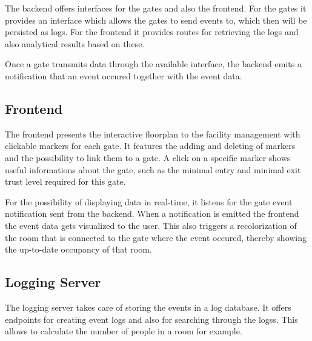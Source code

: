 The backend offers interfaces for the gates and also the frontend. For the gates it provides an interface which allows the gates to send events to, which then will be persisted as logs.
For the frontend it provides routes for retrieving the logs and also analytical results based on these.

Once a gate transmits data through the available interface, the backend emits a notification that an event occured together with the event data. 


\subsection{Frontend}
\label{Frontend}

The frontend presents the interactive floorplan to the facility management with clickable markers for each gate.
It features the adding and deleting of markers and the possibility to link them to a gate.
A click on a specific marker shows useful informations about the gate, such as the minimal entry and minimal exit trust level required for this gate.

For the possibility of displaying data in real-time, it listens for the gate event notification sent from the backend. When a notification is emitted the frontend the event data gets visualized to the user. This also triggers a recolorization of the room that is connected to the gate where the event occured, thereby showing the up-to-date occupancy of that room.

\subsection{Logging Server}
\label{Logging Server}

The logging server takes care of storing the events in a log database. It offers endpoints for creating event logs and also for searching through the logss. This allows to calculate the number of people in a room for example.

\clearpage



